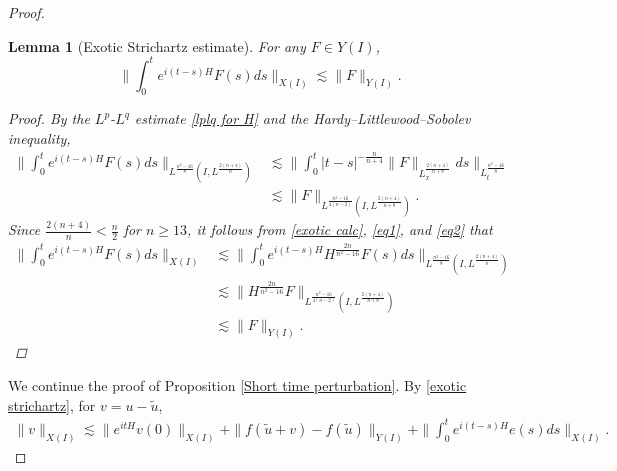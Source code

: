 \documentclass[11pt,a4paper]{article}
\numberwithin{equation}{section}
\newtheorem{lemma}[theorem]{Lemma}
\begin{document}
\begin{proof}
\begin{lemma}[Exotic Strichartz estimate]
For any $F \in Y(I)$,
\begin{equation}\label{exotic strichartz}
\|\int_{0}^{t}e^{i(t - s)H}F(s) ds \|_{X(I)} \lesssim \|F\|_{Y(I)}.
\end{equation}
\begin{proof}
By the $L^{p}$-$L^{q}$ estimate \eqref{lplq for H} and the Hardy--Littlewood--Sobolev inequality,
\begin{equation}\label{exotic calc}
\begin{aligned}
\|\int_{0}^{t}e^{i(t - s)H}F(s) ds \|_{{L^{\frac{n^{2} - 16}{8}}(I, L^{\frac{2(n+4)}{n}})}}
&\lesssim \|\int_{0}^{t}|t - s|^{-\frac{n}{n+4}}\|F\|_{L^{\frac{2(n+4)}{n+8}}_{x}}ds \|_{L^{\frac{n^{2}- 16}{8}}_{t}} \\
&\lesssim \|F\|_{L^{\frac{n^{2} - 16}{4(n-2)}}(I, L^{\frac{2(n+4)}{n + 8}})}.
\end{aligned}
\end{equation}
Since $\frac{2(n+4)}{n} < \frac{n}{2}$ for $n \geq 13$, it follows from \eqref{exotic calc}, \eqref{eq1}, and \eqref{eq2} that
\begin{align*}
\|\int_{0}^{t}e^{i(t - s)H}F(s) ds \|_{X(I)}
&\lesssim \|\int_{0}^{t}e^{i(t - s)H}H^{\frac{2n}{n^{2} - 16}}F(s) ds \|_{{L^{\frac{n^{2} - 16}{8}}(I, L^{\frac{2(n+4)}{n}})}} \\
&\lesssim \|H^{\frac{2n}{n^{2} - 16}}F\|_{L^{\frac{n^{2} - 16}{4(n-2)}}(I, L^{\frac{2(n+4)}{n + 8}})} \\
&\lesssim \|F\|_{Y(I)}.
\end{align*}
\end{proof}
\end{lemma}

We continue the proof of Proposition \ref{Short time perturbation}. By \eqref{exotic strichartz}, for $v = u - \tilde{u}$,
\begin{align}\label{x-y calc}
\|v\|_{X(I)}
\lesssim \|e^{itH}v(0)\|_{X(I)} + \|f(\tilde{u} + v) - f(\tilde{u})\|_{Y(I)} + \|\int_{0}^{t}e^{i(t - s)H}e(s) ds \|_{X(I)}.
\end{align}


\end{proof}
\end{document}
